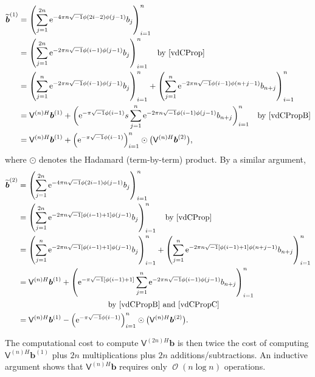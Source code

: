 \documentclass{iitthesis}          %
\DeclareMathOperator{\Order}{{\mathcal O}}
\newcommand{\bm}[1]{\boldsymbol{#1}}
\newcommand{\vb}{\bm{b}}
\newcommand{\mV}{\mathsf{V}}
\newcommand{\me}{\mathrm{e}}
\begin{document}
\begin{align*}
\widetilde{\vb}^{(1)} &= \left( \sum_{j=1}^{2n}  \me^{-4 \pi n \sqrt{-1} \phi(2i-2)\phi(j-1)} b_{j} \right)_{i=1}^n \\
&= \left( \sum_{j=1}^{2n}  \me^{-2 \pi n \sqrt{-1} \phi(i-1)\phi(j-1)} b_{j} \right)_{i=1}^n \quad \text{by \eqref{vdCProp}}\\
&= \left( \sum_{j=1}^{n}  \me^{-2 \pi n \sqrt{-1} \phi(i-1)\phi(j-1)} b_{j} \right)_{i=1}^n  +  \left( \sum_{j=1}^{n}  \me^{-2 \pi n \sqrt{-1} \phi(i-1)\phi(n+j-1)} b_{n+j} \right)_{i=1}^n \\
&= \mV^{(n)H}\vb^{(1)}  +  \biggl(  \me^{-\pi \sqrt{-1} \phi(i-1)}  s \sum_{j=1}^{n}  \me^{-2 \pi n \sqrt{-1} \phi(i-1)\phi(j-1)} b_{n+j} \biggr)_{i=1}^n \quad  \text{by \eqref{vdCPropB}}\\
&= \mV^{(n)H}\vb^{(1)} +  \left(  \me^{-\pi \sqrt{-1} \phi(i-1)} \right)_{i=1}^n \odot \bigl(\mV^{(n)H}\vb^{(2)} \bigr),
\end{align*}
where $\odot$ denotes the Hadamard (term-by-term) product.  By a similar argument, 
\begin{align*}
\widetilde{\vb}^{(2)} &= \left( \sum_{j=1}^{2n}  \me^{-4 \pi n \sqrt{-1} \phi(2i-1)\phi(j-1)} b_{j} \right)_{i=1}^n \\
&= \left( \sum_{j=1}^{2n}  \me^{-2 \pi n \sqrt{-1} [\phi(i-1)+1]\phi(j-1)} b_{j} \right)_{i=1}^n \quad \text{by \eqref{vdCProp}}\\
&= \left( \sum_{j=1}^{n}  \me^{-2 \pi n \sqrt{-1} [\phi(i-1)+1]\phi(j-1)} b_{j} \right)_{i=1}^n 
 +  \left( \sum_{j=1}^{n}  \me^{-2 \pi n \sqrt{-1} [\phi(i-1)+1]\phi(n+j-1)} b_{n+j} \right)_{i=1}^n \\
&= \mV^{(n)H}\vb^{(1)} 
+  \left(  \me^{ -\pi \sqrt{-1} [\phi(i-1) + 1]}  \sum_{j=1}^{n}  \me^{-2 \pi n \sqrt{-1} \phi(i-1)\phi(j-1)} b_{n+j} \right)_{i=1}^n \\
& \hspace{4cm}  \text{by \eqref{vdCPropB} and \eqref{vdCPropC}}\\
&= \mV^{(n)H}\vb^{(1)} -  \left(  \me^{-\pi \sqrt{-1} \phi(i-1)} \right)_{i=1}^n \odot \bigl(\mV^{(n)H}\vb^{(2)} \bigr).
\end{align*}

The computational cost to compute $\mV^{(2n)H}\vb$ is then twice the cost of computing $\mV^{(n)H}\vb^{(1)}$ plus $2n$ multiplications plus $2n$ additions/subtractions.  An inductive argument shows that $\mV^{(n)H}\vb$ requires only $\Order(n \log n)$ operations.
\fi
\end{document}
